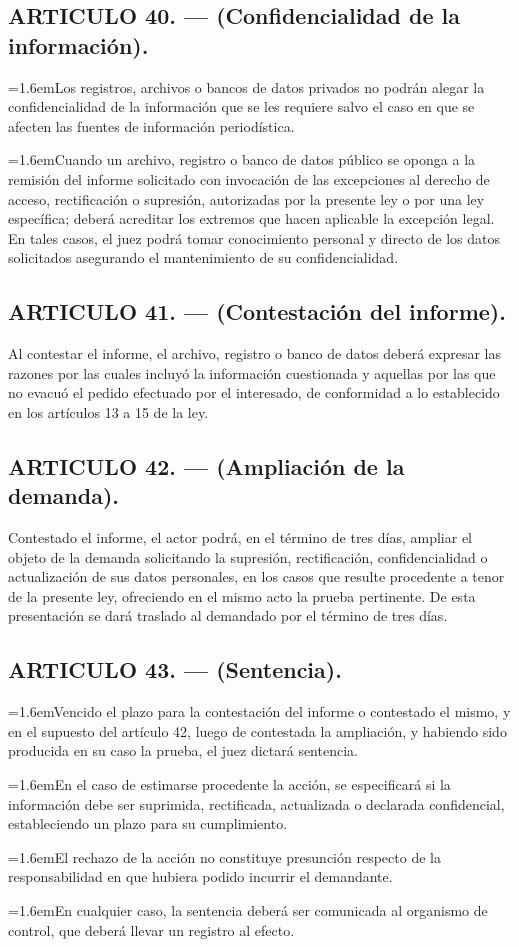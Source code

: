 \documentclass[10pt,a4paper]{article}
\newcommand{\articulo}[1]{\subsection{#1}}
\newcommand{\inciso}[2]{\par{\hangindent=1.6em\hangafter=1\makebox[1.6em][l]{#1}#2\par}}
\begin{document}
\articulo{ARTICULO 40. — (Confidencialidad de la información).}
\inciso{1.}{Los registros, archivos o bancos de datos privados no podrán alegar la confidencialidad de la información que se les requiere salvo el caso en que se afecten las fuentes de información periodística.}

\inciso{2.}{Cuando un archivo, registro o banco de datos público se oponga a la remisión del informe solicitado con invocación de las excepciones al derecho de acceso, rectificación o supresión, autorizadas por la presente ley o por una ley específica; deberá acreditar los extremos que hacen aplicable la excepción legal. En tales casos, el juez podrá tomar conocimiento personal y directo de los datos solicitados asegurando el mantenimiento de su confidencialidad.}

\articulo{ARTICULO 41. — (Contestación del informe).}
Al contestar el informe, el archivo, registro o banco de datos deberá expresar las razones por las cuales incluyó la información cuestionada y aquellas por las que no evacuó el pedido efectuado por el interesado, de conformidad a lo establecido en los artículos 13 a 15 de la ley.

\articulo{ARTICULO 42. — (Ampliación de la demanda).}
Contestado el informe, el actor podrá, en el término de tres días, ampliar el objeto de la demanda solicitando la supresión, rectificación, confidencialidad o actualización de sus datos personales, en los casos que resulte procedente a tenor de la presente ley, ofreciendo en el mismo acto la prueba pertinente. De esta presentación se dará traslado al demandado por el término de tres días.

\articulo{ARTICULO 43. — (Sentencia).}
\inciso{1.}{Vencido el plazo para la contestación del informe o contestado el mismo, y en el supuesto del artículo 42, luego de contestada la ampliación, y habiendo sido producida en su caso la prueba, el juez dictará sentencia.}

\inciso{2.}{En el caso de estimarse procedente la acción, se especificará si la información debe ser suprimida, rectificada, actualizada o declarada confidencial, estableciendo un plazo para su cumplimiento.}

\inciso{3.}{El rechazo de la acción no constituye presunción respecto de la responsabilidad en que hubiera podido incurrir el demandante.}

\inciso{4.}{En cualquier caso, la sentencia deberá ser comunicada al organismo de control, que deberá llevar un registro al efecto.}
\end{document}
